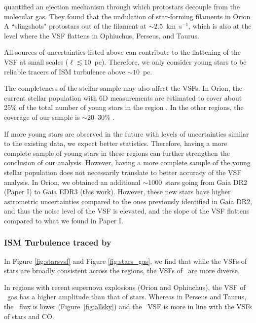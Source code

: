 \citet{stutz_slingshot_2016} quantified an ejection mechanism through which protostars decouple from the molecular gas. They found that the undulation of star-forming filaments in Orion A ``slingshots" protostars out of the filament at $\sim 2.5$~km~s$^{-1}$, which is also at the level where the VSF flattens in Ophiuchus, Perseus, and Taurus. 

All sources of uncertainties listed above can contribute to the flattening of the VSF at small scales ($\ell \lesssim 10$~pc). Therefore, we only consider young stars to be reliable tracers of ISM turbulence above $\sim 10$~pc.

The completeness of the stellar sample may also affect the VSFs. In Orion, the current stellar population with 6D measurements are estimated to cover about 25\% of the total number of young stars in the region \citep[][]{kounkel_untangling_2019}. In the other regions, the coverage of our sample is $\sim 20\text{--}30\%$ \citep[see,][]{luhman_census_2016,briceno-morales_substructure_2022,krolikowski_gaia_2021}.

If more young stars are observed in the future with levels of uncertainties similar to the existing data, we expect better statistics. Therefore, having a more complete sample of young stars in these regions can further strengthen the conclusion of our analysis. However, having a more complete sample of the young stellar population does not necessarily translate to better accuracy of the VSF analysis. In Orion, we obtained an additional $\sim 1000$~stars going from Gaia DR2 (Paper I) to Gaia EDR3 (this work). However, these new stars have higher astrometric uncertainties compared to the ones previously identified in Gaia DR2, and thus the noise level of the VSF is elevated, and the slope of the VSF flattens compared to what we found in Paper I.

\subsubsection{ISM Turbulence traced by \texorpdfstring{\halpha}{H-alpha}}
\label{sec:halpha_discussion}

In Figure \ref{fig:starsvsf} and Figure \ref{fig:stars_gas}, we find that while the VSFs of stars are broadly consistent across the regions, the VSFs of \halpha~are more diverse.

In regions with recent supernova explosions (Orion and Ophiuchus), the VSF of \halpha~gas has a higher amplitude than that of stars. Whereas in Perseus and Taurus, the \halpha~flux is lower (Figure~\ref{fig:allsky}) and the \halpha~VSF is more in line with the VSFs of stars and CO.


